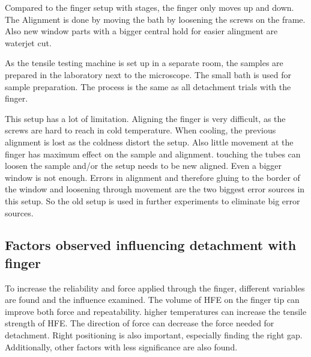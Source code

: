 Compared to the finger setup with stages, the finger only moves up and down. The Alignment is done by moving the bath by loosening the screws on the frame. Also new window parts with a bigger central hold for easier alingment are waterjet cut.

As the tensile testing machine is set up in a separate room, the samples are prepared in the laboratory next to the microscope. The small bath is used for sample preparation. The process is the same as all detachment trials with the finger. 

This setup has a lot of limitation. Aligning the finger is very difficult, as the screws are hard to reach in cold temperature. When cooling, the previous alignment is lost as the coldness distort the setup. Also little movement at the finger has maximum effect on the sample and alignment. touching the tubes can loosen the sample and/or the setup needs to be new aligned. Even a bigger window is not enough. Errors in alignment and therefore gluing to the border of the window and loosening through movement are the two biggest error sources in this setup. So the old setup is used in further experiments to eliminate big error sources.

\subsection{Factors observed influencing detachment with finger}

To increase the reliability and force applied through the finger, different variables are found and the influence examined. The volume of HFE on the finger tip can improve both force and repeatability. higher temperatures can increase the tensile strength of HFE. The direction of force can decrease the force needed for detachment. Right positioning is also important, especially finding the right gap. Additionally, other factors with less significance are also found.



